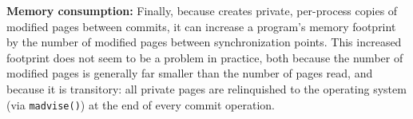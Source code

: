 

\textbf{Memory consumption: }
Finally, because \dthreads{} creates private, per-process copies of modified pages between commits, it can increase a program's memory footprint by the number of modified pages between synchronization points. This increased footprint does not seem to be a problem in practice, both because the number of modified pages is generally far
smaller than the number of pages read, and because it is transitory: all private pages are relinquished to the operating system (via \texttt{madvise()}) at the end of every commit operation.



